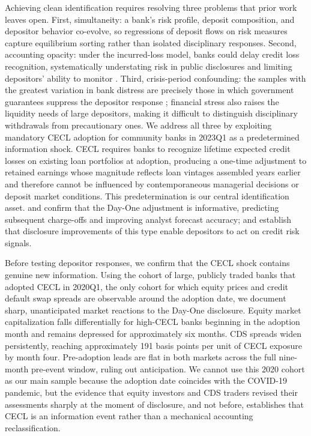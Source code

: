 Achieving clean identification requires resolving three problems that prior work
leaves open.  First, simultaneity: a bank's risk profile, deposit composition,
and depositor behavior co-evolve, so regressions of deposit flows on risk
measures capture equilibrium sorting rather than isolated disciplinary responses.
Second, accounting opacity: under the incurred-loss model, banks could delay
credit loss recognition, systematically understating risk in public disclosures
and limiting depositors' ability to monitor \citep{bushman2012accounting,
bushman2015delayed}.  Third, crisis-period confounding: the samples with the
greatest variation in bank distress are precisely those in which government
guarantees suppress the depositor response \citep{bennett2015market}; financial
stress also raises the liquidity needs of large depositors, making it difficult
to distinguish disciplinary withdrawals from precautionary ones.  We address all
three by exploiting mandatory CECL adoption for community banks in 2023Q1 as a
predetermined information shock.  CECL requires banks to recognize lifetime
expected credit losses on existing loan portfolios at adoption, producing a
one-time adjustment to retained earnings whose magnitude reflects loan vintages
assembled years earlier and therefore cannot be influenced by contemporaneous
managerial decisions or deposit market conditions.  This predetermination is our
central identification asset.  \citet{kim2026current} and \citet{gee2022decision}
confirm that the Day-One adjustment is informative, predicting subsequent
charge-offs and improving analyst forecast accuracy; \citet{nier2006market} and
\citet{chen2022bank} establish that disclosure improvements of this type enable
depositors to act on credit risk signals.

Before testing depositor responses, we confirm that the CECL shock contains
genuine new information.  Using the cohort of large, publicly traded banks that
adopted CECL in 2020Q1, the only cohort for which equity prices and credit
default swap spreads are observable around the adoption date, we document sharp,
unanticipated market reactions to the Day-One disclosure.  Equity market
capitalization falls differentially for high-CECL banks beginning in the adoption
month and remains depressed for approximately six months.  CDS spreads widen
persistently, reaching approximately 191 basis points per unit of CECL exposure
by month four.  Pre-adoption leads are flat in both markets across the full
nine-month pre-event window, ruling out anticipation.  We cannot use this 2020
cohort as our main sample because the adoption date coincides with the COVID-19
pandemic, but the evidence that equity investors and CDS traders revised their
assessments sharply at the moment of disclosure, and not before, establishes
that CECL is an information event rather than a mechanical accounting
reclassification.

